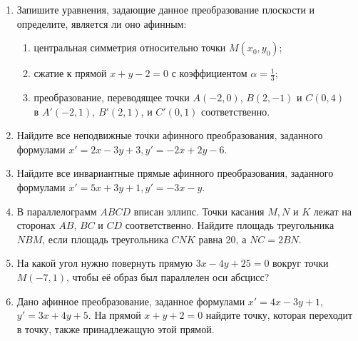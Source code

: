 \begin{enumerate}
    \item Запишите уравнения, задающие данное преобразование плоскости и определите, является ли оно афинным:
        \begin{enumerate}
            \item центральная симметрия относительно точки $M(x_0, y_0)$;
            \item сжатие к прямой $x + y - 2 = 0$ с коэффициентом $\alpha = \frac{1}{3}$;
            \item преобразование, переводящее точки $A(-2, 0)$, $B(2, -1)$ и $C(0, 4)$ \\в $A'(-2, 1)$, $B'(2, 1)$, и $C'(0, 1)$ соответственно.
        \end{enumerate}
   		
   \item  Найдите все неподвижные точки афинного преобразования, заданного формулами ${x' = 2x - 3y +3}, {y' = -2x + 2y - 6}$.
	
	\item Найдите все инвариантные прямые афинного преобразования, заданного формулами ${x' = 5x + 3y +1}, {y' = -3x - y}$.
	
	\item В параллелограмм $ABCD$ вписан эллипс. Точки касания $M, N$ и $K$ лежат на сторонах $AB$, $BC$ и $CD$ соответственно. Найдите площадь треугольника $NBM$, если площадь треугольника $CNK$ равна 20, а $NC = 2BN$.
	
	\item На какой угол нужно повернуть прямую $3x - 4y + 25 = 0$ вокруг точки $M(-7, 1)$, чтобы её образ был параллелен оси абсцисс?
	
	\item Дано афинное преобразование, заданное формулами ${x' = 4x-3y+1}$,  ${y'=3x+4y+5}$. На прямой ${x+y+2=0}$ найдите точку, которая переходит в точку, также принадлежащую этой прямой.
\end{enumerate}